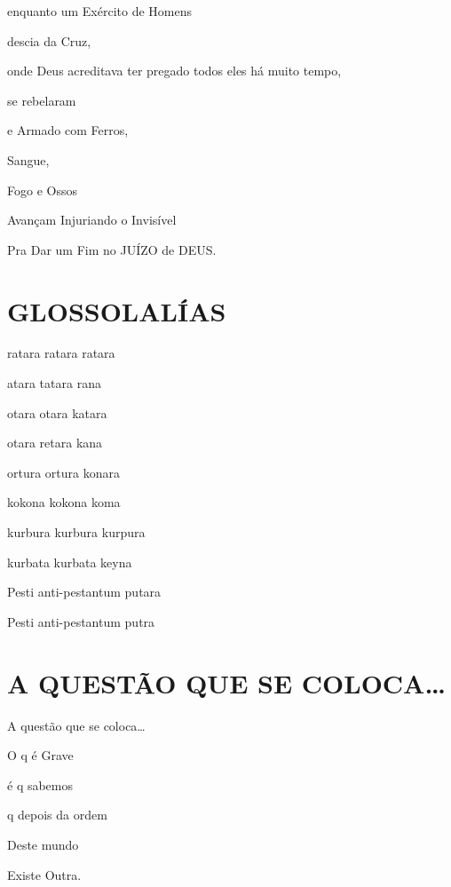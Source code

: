 enquanto um Exército de Homens

descia da Cruz,

onde Deus acreditava ter pregado todos eles há muito tempo,

se rebelaram

e Armado com Ferros,

Sangue,

Fogo e Ossos

Avançam Injuriando o Invisível

Pra Dar um Fim no JUÍZO de DEUS.


\section*{GLOSSOLALÍAS}

\begin{center}
ratara ratara ratara~

atara tatara rana~

otara otara katara~

otara retara kana~

ortura ortura konara~

kokona kokona koma~

kurbura kurbura kurpura~

kurbata kurbata keyna~

Pesti anti-pestantum putara~

Pesti anti-pestantum putra~
\end{center}

\section*{A QUESTÃO QUE SE COLOCA\ldots{}}




A questão que se coloca\ldots{}

O q é Grave

é q sabemos

q depois da ordem

Deste mundo

Existe Outra.


